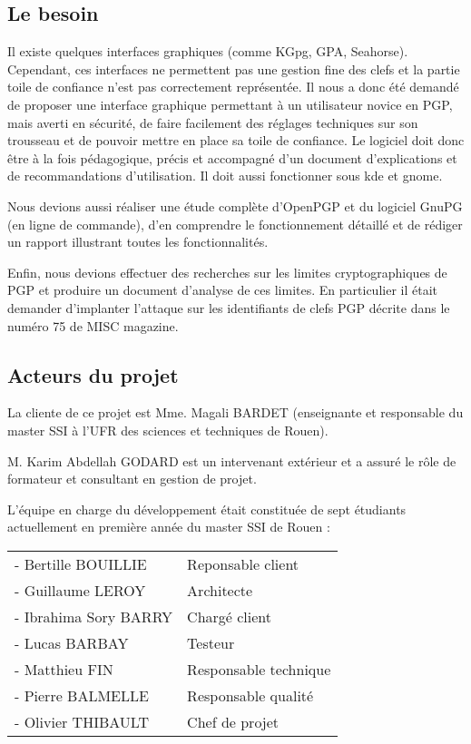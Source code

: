 \documentclass{../res/univ-projet}
\begin{document}
  \subsection{Le besoin}
    Il existe quelques interfaces graphiques (comme KGpg, GPA, Seahorse). 
    Cependant, ces interfaces ne permettent pas une gestion fine des clefs 
    et la partie toile de confiance n’est pas correctement représentée.
    Il nous a donc été demandé de proposer une interface graphique 
    permettant à un utilisateur novice en PGP, mais averti en sécurité, 
    de faire facilement des réglages techniques sur son trousseau et de pouvoir 
    mettre en place sa toile de confiance. Le logiciel doit donc être à la 
    fois pédagogique, précis et accompagné d'un document d’explications et 
    de recommandations d’utilisation. Il doit aussi fonctionner sous kde et 
    gnome.
  
    Nous devions aussi réaliser une étude complète d'OpenPGP et du 
    logiciel GnuPG (en ligne de commande), d’en comprendre le 
    fonctionnement détaillé et de rédiger un rapport illustrant toutes 
    les fonctionnalités.

    Enfin, nous devions effectuer des recherches sur les limites 
    cryptographiques de PGP et produire un document d’analyse de ces 
    limites. En particulier il était demander d'implanter l’attaque sur les 
    identifiants de clefs PGP décrite dans le numéro 75 de MISC magazine.
    
  \subsection{Acteurs du projet}
    La cliente de ce projet est Mme. Magali BARDET (enseignante et responsable 
    du master SSI à l'UFR des sciences et techniques de Rouen). 

    M. Karim Abdellah GODARD est un intervenant extérieur et a assuré le 
    rôle de formateur et consultant en gestion de projet.

    L'équipe en charge du développement était constituée de sept étudiants actuellement en première année du master SSI de Rouen : 

    \begin{tabular}{ll}
    - Bertille BOUILLIE & Reponsable client \\
    - Guillaume LEROY & Architecte \\
    - Ibrahima Sory BARRY & Chargé client \\
    - Lucas BARBAY & Testeur \\
    - Matthieu FIN & Responsable technique \\
    - Pierre BALMELLE & Responsable qualité \\
    - Olivier THIBAULT & Chef de projet \\
    \end{tabular}
    
\end{document}

